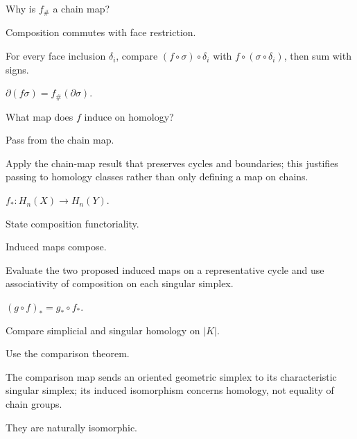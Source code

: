 \begin{exercise}\label{exr:viii17-16}
Why is \(f_\#\) a chain map?
\end{exercise}
\begin{hint}
Composition commutes with face restriction.

For every face inclusion \(\delta_i\), compare \((f\circ\sigma)\circ\delta_i\) with \(f\circ(\sigma\circ\delta_i)\), then sum with signs.
\end{hint}
\begin{solution}
\(\partial(f\sigma)=f_\#(\partial\sigma)\).
\end{solution}

\begin{exercise}\label{exr:viii17-17}
What map does \(f\) induce on homology?
\end{exercise}
\begin{hint}
Pass from the chain map.

Apply the chain-map result that preserves cycles and boundaries; this justifies passing to homology classes rather than only defining a map on chains.
\end{hint}
\begin{solution}
\(f_*:H_n(X)\to H_n(Y)\).
\end{solution}

\begin{exercise}\label{exr:viii17-18}
State composition functoriality.
\end{exercise}
\begin{hint}
Induced maps compose.

Evaluate the two proposed induced maps on a representative cycle and use associativity of composition on each singular simplex.
\end{hint}
\begin{solution}
\((g\circ f)_*=g_*\circ f_*\).
\end{solution}

\begin{exercise}\label{exr:viii17-19}
Compare simplicial and singular homology on \(|K|\).
\end{exercise}
\begin{hint}
Use the comparison theorem.

The comparison map sends an oriented geometric simplex to its characteristic singular simplex; its induced isomorphism concerns homology, not equality of chain groups.
\end{hint}
\begin{solution}
They are naturally isomorphic.
\end{solution}

